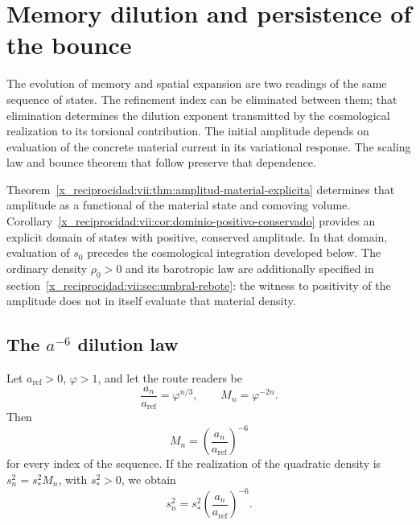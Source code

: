 


\chapter{Memory dilution and persistence of the bounce}
\label{x_reciprocidad:vii:sec:dilucion-rebote}

The evolution of memory and spatial expansion are two readings of
the same sequence of states. The refinement index can be eliminated
between them; that elimination determines the dilution exponent transmitted
by the cosmological realization to its torsional contribution.
The initial amplitude depends on evaluation of the concrete material
current in its variational response. The scaling law and bounce
theorem that follow preserve that dependence.

Theorem~\ref{x_reciprocidad:vii:thm:amplitud-material-explicita} determines that
amplitude as a functional of the material state and comoving volume.
Corollary~\ref{x_reciprocidad:vii:cor:dominio-positivo-conservado} provides
an explicit domain of states with positive, conserved amplitude.
In that domain, evaluation of \(s_0\) precedes the cosmological
integration developed below. The ordinary density
\(\rho_0>0\) and its barotropic law are additionally specified in
section~\ref{x_reciprocidad:vii:sec:umbral-rebote}: the witness to positivity of the
amplitude does not in itself evaluate that material density.

\section{The \texorpdfstring{\(a^{-6}\)}{a to the power -6} dilution law}
\label{x_reciprocidad:vii:sec:dilucion}

\begin{proposition}
\label{x_reciprocidad:vii:prop:dilucion}
Let \(a_{\mathrm{ref}}>0\), \(\varphi>1\), and let the route readers be
\[
 \frac{a_n}{a_{\mathrm{ref}}}=\varphi^{n/3},\qquad
 M_n=\varphi^{-2n}.
\]
Then
\[
 M_n=\left(\frac{a_n}{a_{\mathrm{ref}}}\right)^{-6}
\]
for every index of the sequence. If the realization of the quadratic
density is \(s_n^2=s_*^2M_n\), with \(s_*^2>0\), we obtain
\[
 s_n^2=s_*^2\left(\frac{a_n}{a_{\mathrm{ref}}}\right)^{-6}.
\]
\end{proposition}

